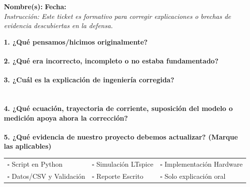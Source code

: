 \documentclass[11pt, a4paper]{article}
\begin{document}
\pagestyle{empty}

\begin{tcolorbox}[colback=white, colframe=black, title={\large \textbf{Ticket de Corrección - Hito 1 (PFI)}}]
\textbf{Nombre(s):} \hrulefill \hfill \textbf{Fecha:} \hrulefill \\[0.3cm]
\textit{Instrucción: Este ticket es formativo para corregir explicaciones o brechas de evidencia descubiertas en la defensa.}

\vspace{0.3cm}
\textbf{1. ¿Qué pensamos/hicimos originalmente?}\\[0.4cm]
\hrulefill \\[0.4cm]
\textbf{2. ¿Qué era incorrecto, incompleto o no estaba fundamentado?}\\[0.4cm]
\hrulefill \\[0.4cm]
\textbf{3. ¿Cuál es la explicación de ingeniería corregida?}\\[0.4cm]
\hrulefill \\[0.4cm]
\hrulefill \\[0.4cm]
\textbf{4. ¿Qué ecuación, trayectoria de corriente, suposición del modelo o medición apoya ahora la corrección?}\\[0.4cm]
\hrulefill \\[0.4cm]
\textbf{5. ¿Qué evidencia de nuestro proyecto debemos actualizar? (Marque las aplicables)}\\
\begin{tabularx}{\textwidth}{X X X}
$\square$ Script en Python & $\square$ Simulación LTspice & $\square$ Implementación Hardware \\
$\square$ Datos/CSV y Validación & $\square$ Reporte Escrito & $\square$ Solo explicación oral \\
\end{tabularx}
\end{tcolorbox}

\vfill
\end{document}
